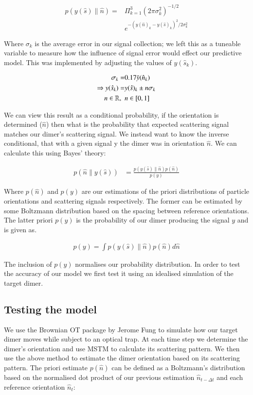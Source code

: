 \documentclass[final,3p, twocolumn]{elsarticle}
\begin{document}
\begin{align}
	p(y(\hat{s})\parallel\hat{n}) =& \Pi^3_{k=1}
	(2\pi\sigma_k^2)^{-1/2} \nonumber \\     &e^{-(y(\hat{n})_k-y(\hat{s})_k)^2/2\sigma_k^2}
\end{align}

Where $\sigma_k$ is the average error in our signal collection; we left this as a tuneable variable to measure how the influence of signal error would effect our predictive model. This was implemented by adjusting the values of $y(\hat{s}_k)$. 

\begin{align}
	\centering
	\sigma_k =& 0.17\bar{y}(\hat{n}_k) \\
	\Rightarrow y(\hat{s}_k) =& y(\hat{s})_k \pm n\sigma_k \\ 
	n \in \mathbb{R}, \ \ & n\in[0,1] \nonumber
\end{align}

We can view this result as a conditional probability, if the orientation is determined ($\hat{n}$) then what is the probability that expected scattering signal matches our dimer's scattering signal. We instead want to know the inverse conditional, that with a given signal y the dimer was in orientation $\hat{n}$. We can calculate this using Bayes' theory:

\begin{align}
	p(\hat{n}\parallel y(\hat{s}))&= \frac{p(y(\hat{s})\parallel\hat{n})p(\hat{n})}{p(y)}
\end{align}

Where $p(\hat{n})$ and $p(y)$ are our estimations of the priori distributions of particle orientations and scattering signals respectively. The former can be estimated by some Boltzmann distribution based on the spacing between reference orientations. The latter priori $p(y)$ is the probability of our dimer producing the signal $y$ and is given as. 

\begin{align}
	p(y) = \int p(y(\hat{s})\parallel \hat{n}) p(\hat{n}) d\hat{n}
\end{align}

The inclusion of $p(y)$ normalises our probability distribution. In order to test the accuracy of our model we first test it using an idealised simulation of the target dimer. 

\subsection{Testing the model}
\label{2.1}
We use the Brownian OT package by Jerome Fung \cite{Brownian_OT} to simulate how our target dimer moves while subject to an optical trap. At each time step we determine the dimer's orientation and use MSTM to calculate its scattering pattern. We then use the above method to estimate the dimer orientation based on its scattering pattern. The priori estimate $p(\hat{n})$ can be defined as a Boltzmann's distribution based on the normalised dot product of our previous estimation $\hat{n}_{t-\Delta t}$ and each reference orientation $\hat{n}_t$:
\end{document}
